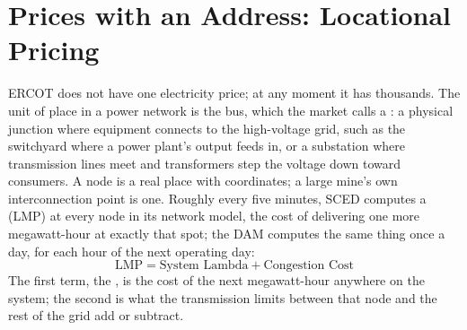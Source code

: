 \section{Prices with an Address: Locational Pricing}

ERCOT does not have one electricity price; at any moment it has thousands. The unit of place in a power network is the bus, which the market calls a : a physical junction where equipment connects to the high-voltage grid, such as the switchyard where a power plant's output feeds in, or a substation where transmission lines meet and transformers step the voltage down toward consumers. A node is a real place with coordinates; a large mine's own interconnection point is one. Roughly every five minutes, SCED computes a  (LMP) at every node in its network model, the cost of delivering one more megawatt-hour at exactly that spot; the DAM computes the same thing once a day, for each hour of the next operating day: %
\[
\text{LMP} = \text{System Lambda} + \text{Congestion Cost}
\]
The first term, the , is the cost of the next megawatt-hour anywhere on the system; the second is what the transmission limits between that node and the rest of the grid add or subtract. %
